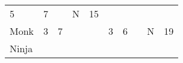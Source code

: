 \documentclass[12pt]{article}
\newcommand{\indexClass}[1]{\index{#1}}
\newcommand{\class}[1]{#1\indexClass{#1}}
\begin{document}
\begin{longtable}[]{@{}llllllllll@{}}
\begin{minipage}[t]{0.06\columnwidth}\raggedright\strut
5
\strut\end{minipage} &
\begin{minipage}[t]{0.06\columnwidth}\raggedright\strut
7
\strut\end{minipage} &
\begin{minipage}[t]{0.06\columnwidth}\raggedright\strut
\strut\end{minipage} &
\begin{minipage}[t]{0.07\columnwidth}\raggedright\strut
N
\strut\end{minipage} &
\begin{minipage}[t]{0.08\columnwidth}\raggedright\strut
15
\strut\end{minipage}\tabularnewline
\begin{minipage}[t]{0.13\columnwidth}\raggedright\strut
\class{Monk}
\strut\end{minipage} &
\begin{minipage}[t]{0.06\columnwidth}\raggedright\strut
3
\strut\end{minipage} &
\begin{minipage}[t]{0.06\columnwidth}\raggedright\strut
7
\strut\end{minipage} &
\begin{minipage}[t]{0.06\columnwidth}\raggedright\strut
\strut\end{minipage} &
\begin{minipage}[t]{0.06\columnwidth}\raggedright\strut
\strut\end{minipage} &
\begin{minipage}[t]{0.06\columnwidth}\raggedright\strut
3
\strut\end{minipage} &
\begin{minipage}[t]{0.06\columnwidth}\raggedright\strut
6
\strut\end{minipage} &
\begin{minipage}[t]{0.06\columnwidth}\raggedright\strut
\strut\end{minipage} &
\begin{minipage}[t]{0.07\columnwidth}\raggedright\strut
N
\strut\end{minipage} &
\begin{minipage}[t]{0.08\columnwidth}\raggedright\strut
19
\strut\end{minipage}\tabularnewline
\begin{minipage}[t]{0.13\columnwidth}\raggedright\strut
\class{Ninja}
\strut\end{minipage} &

\end{longtable}
\end{document}

